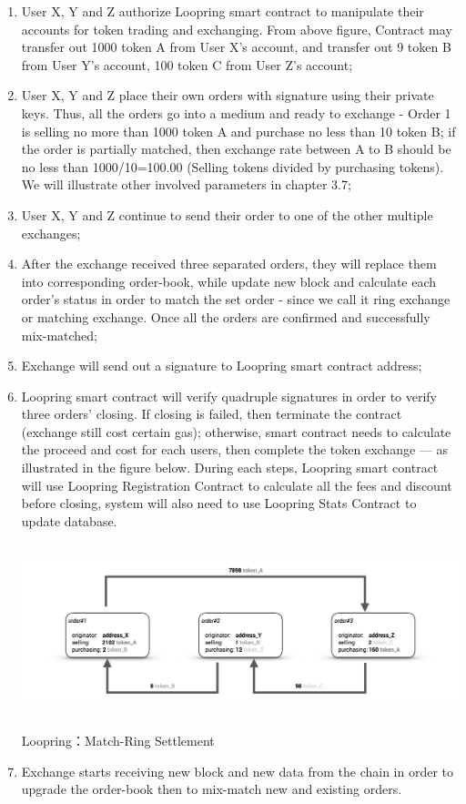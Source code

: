 \documentclass[UTF8,nofonts]{article}
\makeatletter
\newenvironment{figurehere}
 {\def\@captype{figure}}
 {}
\makeatother
\begin{document}
\begin{enumerate}
 \item User X,  Y and Z authorize Loopring smart contract to manipulate their accounts for token trading and exchanging. From above figure,  Contract may transfer out 1000 token A from User X's account,  and transfer out 9 token B from User Y's account,  100 token C from User Z's account;
 \item User X,  Y and Z place their own orders with signature using their private keys. Thus,  all the orders go into a medium and ready to exchange - Order 1 is selling no more than 1000 token A and purchase no less than 10 token B; if the order is partially matched,  then exchange rate between A to B should be no less than 1000/10=100.00 (Selling tokens divided by purchasing tokens). We will illustrate other involved parameters in chapter 3.7;
 \item User X,  Y and Z continue to send their order to one of the other multiple exchanges;
 \item After the exchange received three separated orders,  they will replace them into corresponding order-book, while update new block and calculate each order's status in order to match the set order - since we call it ring exchange or matching exchange. Once all the orders are confirmed and successfully mix-matched;
 \item Exchange will send out a signature to Loopring smart contract address;
 \item Loopring smart contract will verify quadruple signatures in order to verify three orders' closing. If closing is failed,  then terminate the contract (exchange still cost certain gas); otherwise,  smart contract needs to calculate the proceed and cost for each users, then complete the token exchange --- as illustrated in the figure below. During each steps, Loopring smart contract will use Loopring Registration Contract to calculate all the fees and discount before closing,  system will also need to use Loopring Stats Contract to update database.

\begin{center}
\begin{figurehere}
\includegraphics[height=5cm]{images/en-Loopring-example.png}
\caption{Loopring：Match-Ring Settlement}
\label{fig:Loopringprotocol}
\end{figurehere}
\end{center}
  
  
 \item Exchange starts receiving new block and new data from the chain in order to upgrade the order-book then to mix-match new and existing orders.
\end{enumerate}
\end{document}
